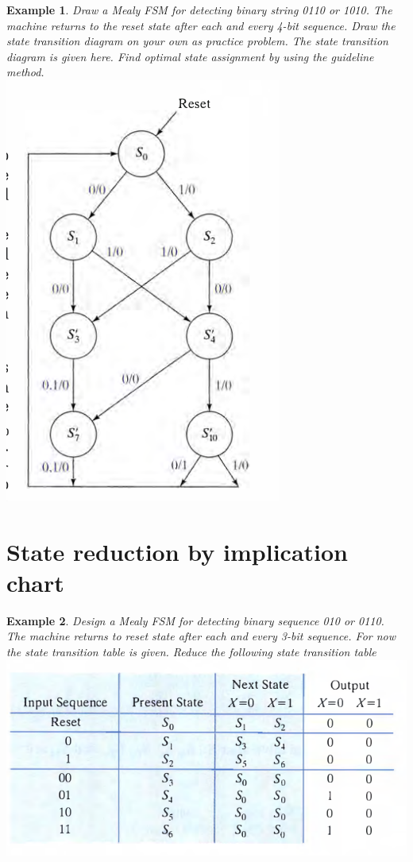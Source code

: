 \documentclass{article}
\newtheorem{example}{Example}
\begin{document}
\begin{example}
  Draw a Mealy FSM for detecting binary string 0110 or 1010. The machine returns
  to the reset state after each and every 4-bit sequence. Draw the state
  transition diagram on your own as practice problem. The state transition
  diagram is given here. Find optimal state assignment by using the guideline method.\\
  \includegraphics[width=0.3\linewidth]{./media/fig8.6-4-bit-string.png}
\end{example}



\section{State reduction by implication chart}

\begin{example}
  Design a Mealy FSM for detecting binary sequence 010 or 0110. The machine
  returns to reset state after each and every 3-bit sequence. For now the state
  transition table is given.
  Reduce the following state transition table \\
  \includegraphics[width=\linewidth]{./media/fig8.8-initial-3-bit-seq-det.png}
\end{example}
\newpage
\end{document}
